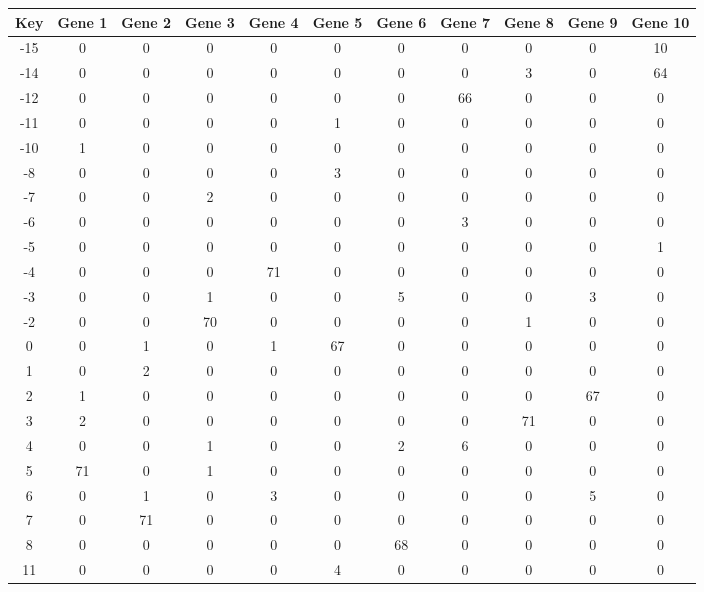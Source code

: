 \begin{tabular}{|c|c|c|c|c|c|c|c|c|c|c|}
\hline
Key & Gene 1 & Gene 2 & Gene 3 & Gene 4 & Gene 5 & Gene 6 & Gene 7 & Gene 8 & Gene 9 & Gene 10 \\
\hline
-15 & 0 & 0 & 0 & 0 & 0 & 0 & 0 & 0 & 0 & 10 \\
-14 & 0 & 0 & 0 & 0 & 0 & 0 & 0 & 3 & 0 & 64 \\
-12 & 0 & 0 & 0 & 0 & 0 & 0 & 66 & 0 & 0 & 0 \\
-11 & 0 & 0 & 0 & 0 & 1 & 0 & 0 & 0 & 0 & 0 \\
-10 & 1 & 0 & 0 & 0 & 0 & 0 & 0 & 0 & 0 & 0 \\
-8 & 0 & 0 & 0 & 0 & 3 & 0 & 0 & 0 & 0 & 0 \\
-7 & 0 & 0 & 2 & 0 & 0 & 0 & 0 & 0 & 0 & 0 \\
-6 & 0 & 0 & 0 & 0 & 0 & 0 & 3 & 0 & 0 & 0 \\
-5 & 0 & 0 & 0 & 0 & 0 & 0 & 0 & 0 & 0 & 1 \\
-4 & 0 & 0 & 0 & 71 & 0 & 0 & 0 & 0 & 0 & 0 \\
-3 & 0 & 0 & 1 & 0 & 0 & 5 & 0 & 0 & 3 & 0 \\
-2 & 0 & 0 & 70 & 0 & 0 & 0 & 0 & 1 & 0 & 0 \\
0 & 0 & 1 & 0 & 1 & 67 & 0 & 0 & 0 & 0 & 0 \\
1 & 0 & 2 & 0 & 0 & 0 & 0 & 0 & 0 & 0 & 0 \\
2 & 1 & 0 & 0 & 0 & 0 & 0 & 0 & 0 & 67 & 0 \\
3 & 2 & 0 & 0 & 0 & 0 & 0 & 0 & 71 & 0 & 0 \\
4 & 0 & 0 & 1 & 0 & 0 & 2 & 6 & 0 & 0 & 0 \\
5 & 71 & 0 & 1 & 0 & 0 & 0 & 0 & 0 & 0 & 0 \\
6 & 0 & 1 & 0 & 3 & 0 & 0 & 0 & 0 & 5 & 0 \\
7 & 0 & 71 & 0 & 0 & 0 & 0 & 0 & 0 & 0 & 0 \\
8 & 0 & 0 & 0 & 0 & 0 & 68 & 0 & 0 & 0 & 0 \\
11 & 0 & 0 & 0 & 0 & 4 & 0 & 0 & 0 & 0 & 0 \\
\hline
\end{tabular}